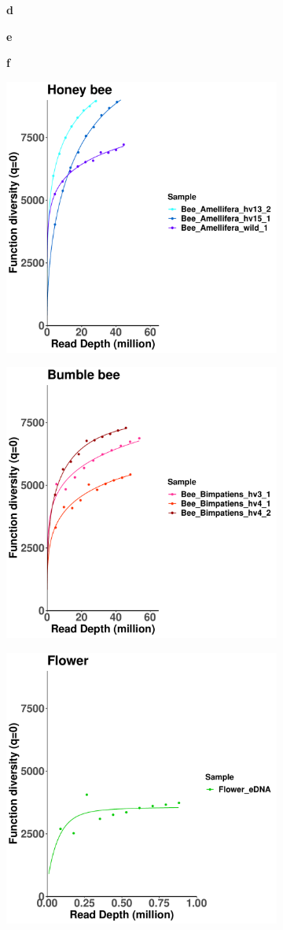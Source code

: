 \documentclass[11pt]{article}
\begin{document}
\begin{figure}[H]
\begin{subfigure}
      \end{subfigure}
      \newline
      \begin{subfigure}
        \centering
        \textbf{d}
      \end{subfigure}
      \hspace{0.32\linewidth}
      \begin{subfigure}
        \centering
        \textbf{e}
      \end{subfigure}
      \hspace{0.32\linewidth}
      \begin{subfigure}
        \centering
        \textbf{f}
      \end{subfigure}
      \newline
      \hfill
      \begin{subfigure}
        \centering
        \includegraphics[width=0.3\linewidth,height=0.3\linewidth]{../Figures/Honey_FunctionHill_0.pdf}
      \end{subfigure}
      \hfill
      \begin{subfigure}
        \centering
        \includegraphics[width=0.3\linewidth,height=0.3\linewidth]{../Figures/Bumble_FunctionHill_0.pdf}
      \end{subfigure}
      \hfill
      \begin{subfigure}
        \centering
        \includegraphics[width=0.3\linewidth,height=0.3\linewidth]{../Figures/Flower_FunctionHill_0.pdf}

\end{subfigure}
\end{figure}
\end{document}
